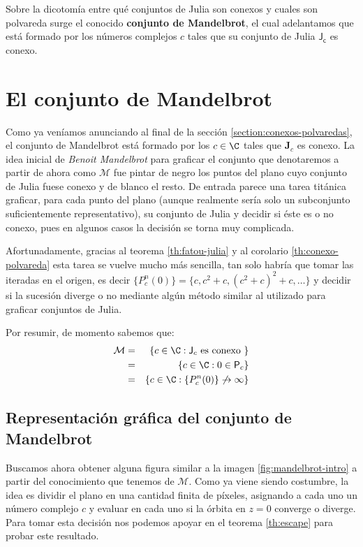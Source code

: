 Sobre la dicotomía entre qué conjuntos de Julia son conexos y cuales son polvareda surge el conocido \textbf{conjunto de Mandelbrot}, el cual adelantamos que está formado por los números complejos $c$ tales que su conjunto de Julia $\mathsf{J_c}$ es conexo. 

\section{El conjunto de Mandelbrot}

Como ya veníamos anunciando al final de la sección \ref{section:conexos-polvaredas}, el conjunto de Mandelbrot está formado por los $c\in\C$ tales que $\textbf{J}_c$ es conexo. La idea inicial de \textit{Benoit Mandelbrot} para graficar el conjunto que denotaremos a partir de ahora como $\mathcal{M}$ fue pintar de negro los puntos del plano cuyo conjunto de Julia fuese conexo y de blanco el resto. De entrada parece una tarea titánica graficar, para cada punto del plano (aunque realmente sería solo un subconjunto suficientemente representativo), su conjunto de Julia y decidir si éste es o no conexo, pues en algunos casos la decisión se torna muy complicada.

Afortunadamente, gracias al teorema \ref{th:fatou-julia} y al corolario \ref{th:conexo-polvareda} esta tarea se vuelve mucho más sencilla, tan solo habría que tomar las iteradas en el origen, es decir $\{P_c^n(0)\}=\{c, c^2+c, (c^2+c)^2+c, \dots\}$ y decidir si la sucesión diverge o no mediante algún método similar al utilizado para graficar conjuntos de Julia.

Por resumir, de momento sabemos que:
\begin{eqnarray*}
  \mathcal{M} & = & \{c\in\C : \mathsf{J}_c \text{ es conexo }\} \\
              & = & \{c\in\C : 0\in\mathsf{P}_c \} \\
              & = & \{c\in\C : \{P_c^n(0)\}\not\rightarrow\infty\}
\end{eqnarray*}

\subsection{Representación gráfica del conjunto de Mandelbrot}

Buscamos ahora obtener alguna figura similar a la imagen \ref{fig:mandelbrot-intro} a partir del conocimiento que tenemos de $\mathcal M$. Como ya viene siendo costumbre, la idea es dividir el plano en una cantidad finita de píxeles, asignando a cada uno un número complejo $c$ y evaluar en cada uno si la órbita en $z=0$ converge o diverge. Para tomar esta decisión nos podemos apoyar en el teorema \ref{th:escape} para probar este resultado.

